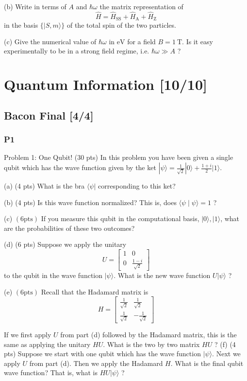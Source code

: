 \documentclass[11pt]{article}
\begin{document}
(b) Write in terms of \(A\) and \(\hbar \omega\) the matrix representation of $$
\hat{H}=\hat{H}_{\mathrm{SS}}+\hat{H}_{\mathrm{A}}+\hat{H}_{\mathrm{Z}} $$ in
the basis \(\{|S, m\rangle\}\) of the total spin of the two particles.

(c) Give the numerical value of \(\hbar \omega\) in \(\mathrm{eV}\) for a field \(B=1
\mathrm{~T}\). Is it easy experimentally to be in a strong field regime, i.e. \(\hbar
\omega \gg A\) ?
\section{Quantum Information [10/10]}
\label{sec:orgab03201}
\subsection{Bacon Final [4/4]}
\label{sec:orgeb9eaf6}
\subsubsection{P1}
\label{sec:org5a1df67}
Problem 1: One Qubit! (30 pts) In this problem you have been given a single
qubit which has the wave function given by the ket
\(|\psi\rangle=\frac{1}{\sqrt{2}}|0\rangle+\frac{1+i}{2}|1\rangle\).

(a) (4 pts) What is the bra \(\langle\psi|\) corresponding to this ket?

(b) (4 pts) Is this wave function normalized? This is, does \(\langle\psi \mid \psi\rangle=1\) ?

(c) \((6 \mathrm{pts})\) If you measure this qubit in the computational basis,
\(|0\rangle,|1\rangle\), what are the probabilities of these two outcomes?

(d) (6 pts) Suppose we apply the unitary $$ U=\left[\begin{array}{cc} 1 & 0 \\ 0
& \frac{1-i}{\sqrt{2}} \end{array}\right] $$ to the qubit in the wave function
\(|\psi\rangle\). What is the new wave function \(U|\psi\rangle\) ?

(e) \((6 \mathrm{pts})\) Recall that the Hadamard matrix is $$
H=\left[\begin{array}{cc} \frac{1}{\sqrt{2}} & \frac{1}{\sqrt{2}}
\\ \frac{1}{\sqrt{2}} & -\frac{1}{\sqrt{2}} \end{array}\right] $$

If we first apply \(U\) from part (d) followed by the Hadamard matrix, this is the
same as applying the unitary \(H U\). What is the two by two matrix \(H U\) ? (f) (4
pts) Suppose we start with one qubit which has the wave function \(|\psi\rangle\). Next we
apply \(U\) from part (d). Then we apply the Hadamard \(H\). What is the final qubit
wave function? That is, what is \(H U|\psi\rangle\) ?
\end{document}
